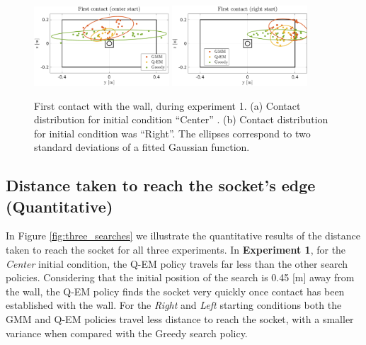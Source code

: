 \begin{figure}
  \centering
   \includegraphics[width=0.45\textwidth]{./ch4-PiH/Figures/Fig/first_contact_center.pdf}
   \includegraphics[width=0.45\textwidth]{./ch4-PiH/Figures/Fig/first_contact_right.pdf}
   \caption{First contact with the wall, during experiment 1. (a) Contact distribution for initial condition ``Center'' . (b) 
   Contact distribution for initial condition was ``Right''. The ellipses correspond to two standard deviations of a fitted Gaussian 
   function.}
   \label{fig:first_contact}
\end{figure}

\subsection{Distance taken to reach the socket's edge (Quantitative)}

In Figure \ref{fig:three_searches} we illustrate the quantitative results of the distance taken 
to reach the socket for all three experiments. In \textbf{Experiment 1}, for the \textit{Center} initial condition,
the Q-EM policy travels far less than the other search policies. Considering that the initial position of the search is 
0.45 [m] away from the wall, the Q-EM policy finds the socket very quickly once contact has been established with the wall. 
For the \textit{Right} and \textit{Left} starting conditions both the GMM and Q-EM policies travel less distance to reach the socket, with a 
smaller variance when compared with the Greedy search policy.

